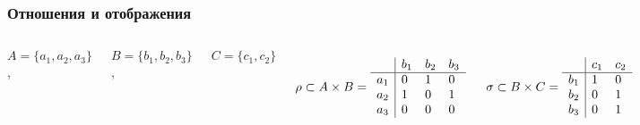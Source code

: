 \documentclass[24pt,pdf,hyperref={unicode},aspectratio=169]{beamer}
\begin{document}
\begin{frame}\frametitle{Отношения и отображения}
\begin{columns}
$
A=\{a_1,a_2, a_3\}$, 

$B=\{b_1,b_2,b_3\}$, 

$C=\{c_1,c_2\}$

$$
\rho\subset A \times B=
\begin{array}{l|l l l}
    & b_1 & b_2 & b_3 \\
\hline
a_1 &  0  &  1 & 0 \\
a_2 &  1  &  0 & 1 \\
a_3 &  0  &  0 & 0 \\
\end{array}
$$

$$
\sigma\subset B \times C =
\begin{array}{l|l l l}
    & c_1 & c_2 \\
\hline
b_1 &  1  &  0 \\
b_2 &  0  &  1 \\
b_3 &  0  &  1 \\
\end{array}
$$



\end{columns}
\end{frame}
\end{document}

